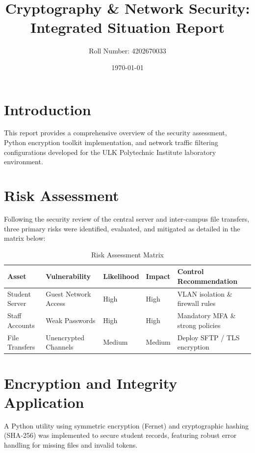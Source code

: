 \documentclass[12pt,a4paper]{article}
\title{\textbf{Cryptography \& Network Security: Integrated Situation Report}}
\author{Roll Number: 4202670033}
\date{\today}
\begin{document}
\maketitle

\section{Introduction}
This report provides a comprehensive overview of the security assessment, Python encryption toolkit implementation, and network traffic filtering configurations developed for the ULK Polytechnic Institute laboratory environment.

\section{Risk Assessment}
Following the security review of the central server and inter-campus file transfers, three primary risks were identified, evaluated, and mitigated as detailed in the matrix below:

\begin{table}[h]
\centering
\begin{tabular}{lllll}
\toprule
\textbf{Asset} & \textbf{Vulnerability} & \textbf{Likelihood} & \textbf{Impact} & \textbf{Control Recommendation} \\ \midrule
Student Server & Guest Network Access & High & High & VLAN isolation \& firewall rules \\
Staff Accounts & Weak Passwords & High & High & Mandatory MFA \& strong policies \\
File Transfers & Unencrypted Channels & Medium & Medium & Deploy SFTP / TLS encryption \\ \bottomrule
\end{tabular}
\caption{Risk Assessment Matrix}
\label{tab:risk_matrix}
\end{table}

\section{Encryption and Integrity Application}
A Python utility using symmetric encryption (Fernet) and cryptographic hashing (SHA-256) was implemented to secure student records, featuring robust error handling for missing files and invalid tokens.
\end{document}
